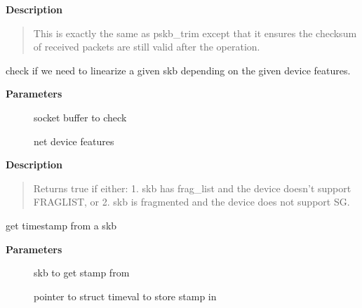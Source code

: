 \documentclass[a4paper,8pt,english]{sphinxmanual}
\begin{document}
\textbf{Description}
\begin{quote}

This is exactly the same as pskb\_trim except that it ensures the
checksum of received packets are still valid after the operation.
\end{quote}

\begin{fulllineitems}
\label{networking/kapi:c.skb_needs_linearize}
check if we need to linearize a given skb depending on the given device features.

\end{fulllineitems}


\textbf{Parameters}
\begin{description}
\item[{}] \leavevmode
socket buffer to check

\item[{}] \leavevmode
net device features

\end{description}

\textbf{Description}
\begin{quote}

Returns true if either:
1. skb has frag\_list and the device doesn't support FRAGLIST, or
2. skb is fragmented and the device does not support SG.
\end{quote}

\begin{fulllineitems}
\label{networking/kapi:c.skb_get_timestamp}
get timestamp from a skb

\end{fulllineitems}


\textbf{Parameters}
\begin{description}
\item[{}] \leavevmode
skb to get stamp from

\item[{}] \leavevmode
pointer to struct timeval to store stamp in

\end{description}
\end{document}

